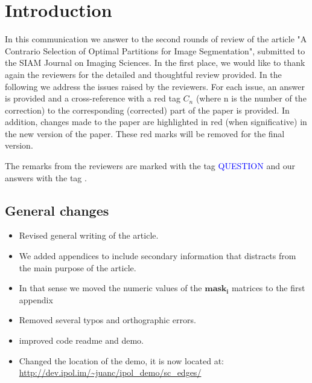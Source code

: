 \documentclass[a4paper,10pt]{report}
\title{}
\author{}
\begin{document}
\maketitle


\chapter{Introduction}
In this communication we answer to the second rounds of review of the article "A Contrario Selection of Optimal Partitions for Image Segmentation", submitted to the SIAM Journal on Imaging Sciences.
In the first place, we would like to thank again the reviewers for the detailed and thoughtful review provided. In the following we address the issues raised by the reviewers. For each issue, an answer is provided and a cross-reference with a red tag $C_n$ (where n is the number of the correction) to the corresponding (corrected) part of the paper is provided. In addition, changes made to the paper are highlighted in red (when significative) in the new version of the paper. 
These red marks will be removed for the final version.

The remarks from the reviewers are marked with the tag \textcolor{blue}{QUESTION} and our answers with the tag \ans.

\section{General changes}
\begin{itemize}
 \item Revised general writing of the article.
\item We added appendices to include secondary information that distracts from the main purpose of the article.
\item In that sense we moved the numeric values of the $\mathbf{mask_i}$ matrices to the first appendix
\item Removed several typos and orthographic errors.
\item improved code readme and demo.
\item  Changed the location of the demo, it is now located at: \url{http://dev.ipol.im/~juanc/ipol_demo/sc_edges/}
\end{itemize}
\end{document}
